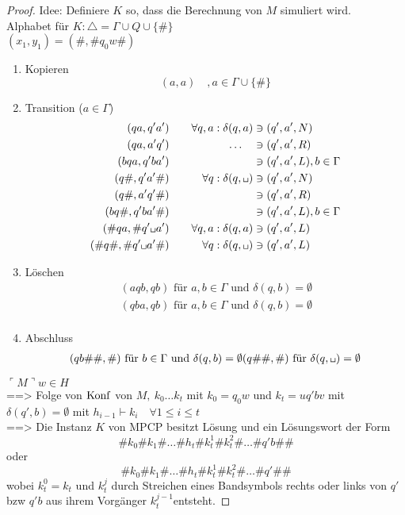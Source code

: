 {\begin{proof}
	Idee: Definiere $K$ so, dass die Berechnung von $M$ simuliert wird.\\
	Alphabet für $K: \triangle = \Gamma\cup Q\cup\{\#\}$\\
	$(x_1,y_1) = (\#,\#q_0w\#)$
	\begin{enumerate}
	\item Kopieren
		\[ (a,a)\quad, a\in\Gamma\cup\{\#\} \]
	\item Transition ($a \in \Gamma$)
		\begin{alignat*}{2}
			(qa,q'a') &\quad& \forall q,a:\delta(q,a) &\ni(q',a',N)\\
			(qa,a'q') && \dots\quad &\ni(q',a',R)\\
			(bqa,q'ba') &&  &\ni(q',a',L),b\in\Gamma\\
			(q\#,q'a'\#) && \forall q: \delta(q,\blank)&\ni(q',a',N)\\
			(q\#,a'q'\#) && &\ni(q',a',R)\\
			(bq\#,q'ba'\#) && &\ni(q',a',L),b\in\Gamma\\
			(\#qa,\#q'\blank a')&& \forall q,a:\delta(q,a) &\ni(q',a',L)\\
			(\#q\#,\#q'\blank a'\#)&& \forall q:\delta(q,\blank) &\ni(q',a',L)
		\end{alignat*}
	\item Löschen
		\begin{align*}
      &(aqb,qb) \text{ für $a,b\in \Gamma$  und $\delta(q,b) = \emptyset$ } \\
      &(qba,qb) \text{ für $a,b\in \Gamma$ und $\delta(q,b) = \emptyset$ } \\
		\end{align*}
	\item Abschluss
    \begin{align*}
      (qb\#\#,\#) \text{ für $b \in \Gamma$ und $\delta(q,b) = \emptyset$}
      (q\#\#,\#) \text{ für $\delta(q,\blank) = \emptyset$}
  \end{align*}
	\end{enumerate}
	$\ulcorner M \urcorner w\in H$\\
  \<==> Folge von $\operatorname{Konf}$ von $M,\ k_0\dots k_t$ mit $k_0 =q_0w$ und $k_t = uq'bv$ mit $\delta(q',b) = \emptyset$
	mit $h_{i-1}\vdash k_i\quad \forall 1\leq i\leq t$\\
	\<==> Die Instanz $K$ von \ac{MPCP} besitzt Lösung und ein Lösungswort der Form
	\[ \#k_0\#k_1\# \dots \#h_t\#k_t^1\#k_t^2\# \dots \#q'b\#\# \]
  oder 
	\[ \#k_0\#k_1\# \dots \#h_t\#k_t^1\#k_t^2\# \dots \#q'\#\# \]
	wobei $k_t^0 = k_t$ und $k_t^j$ durch Streichen eines Bandsymbols rechts oder links von $q'$ bzw $q'b$ aus ihrem Vorgänger $k_t^{j-1}$entsteht.


\end{proof}}
